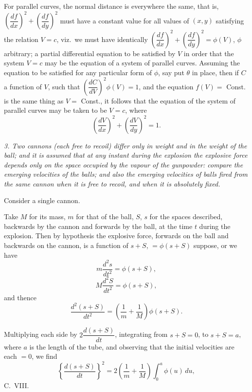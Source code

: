 \documentclass[11pt,a4paper]{article}
\theoremstyle{plain}
\theoremstyle{definition}
\begin{document}
For parallel curves, the normal distance is everywhere the same, that is, $\left(\dfrac{df}{dx}\right)^2 + \left(\dfrac{df}{dy}\right)^2$
must have a constant value for all values of $(x, y)$ satisfying the relation $V = c$, viz.\
we must have identically $\left(\dfrac{df}{dx}\right)^2 + \left(\dfrac{df}{dy}\right)^2 = \phi(V)$, $\phi$ arbitrary; a partial differential equation to be satisfied by $V$ in order that the system $V = c$ may be the equation of a system of parallel curves. Assuming the equation to be satisfied for any particular form of $\phi$,
say put $\theta$ in place, then if $C$ a function of $V$, such that $\left(\dfrac{dC}{dV}\right)^2 \phi(V) = 1$, and
the equation $f(V) = $ Const. is the same thing as $V = $ Const., it follows that the
equation of the system of parallel curves may be taken to be $V = c$, where
\[
\left(\frac{dV}{dx}\right)^2 + \left(\frac{dV}{dy}\right)^2 = 1.
\]

\textit{3. Two cannons (each free to recoil) differ only in weight and in the weight of
the ball; and it is assumed that at any instant during the explosion the explosive force
depends only on the space occupied by the vapour of the gunpowder: compare the
emerging velocities of the balls; and also the emerging velocities of balls fired from the
same cannon when it is free to recoil, and when it is absolutely fixed.}

Consider a single cannon.

Take $M$ for its mass, $m$ for that of the ball, $S$, $s$ for the spaces described, backwards by the cannon and forwards by the ball, at the time $t$ during the explosion. Then
by hypothesis the explosive force, forwards on the ball and backwards on
the cannon, is a function of $s+S$, $=\phi(s+S)$ suppose, or we have
\[
m\frac{d^2s}{dt^2}=\phi(s+S),
\]
\[
M\frac{d^2S}{dt^2}=\phi(s+S),
\]
and thence
\[
\frac{d^2(s+S)}{dt^2}=\left(\frac{1}{m}+\frac{1}{M}\right)\phi(s+S).
\]

Multiplying each side by $2\dfrac{d(s+S)}{dt}$, integrating from $s+S=0$, to $s+S=a$, where $a$
is the length of the tube, and observing that the initial velocities are each $= 0$, we find
\[
\left\{\frac{d(s+S)}{dt}\right\}^2
=2\left(\frac{1}{m}+\frac{1}{M}\right)\int_0^a\phi(u)\,du,
\]
\bigskip
\hfill{\small C.\ VIII.}
\end{document}
